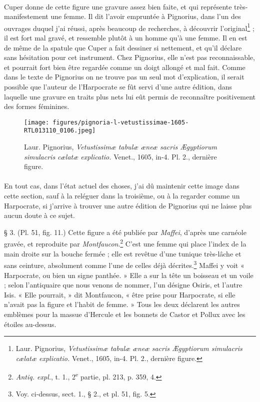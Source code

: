 \documentclass[a4paper, 11pt, oneside, polutonikogreek, french]{article}
\begin{document}
\paragraph{}
Cuper donne de cette figure une gravure assez bien faite, et qui représente très-manifestement une femme. Il dit l'avoir empruntée à Pignorius, dans l'un des ouvrages duquel j'ai réussi, après beaucoup de recherches, à découvrir l'original\footnote{Laur. Pignorius, \emph{Vetustissimæ tabulæ æneæ sacris Ægyptiorum simulacris cælatæ explicatio.} Venet., 1605, in-4. Pl. 2., dernière figure.} ; il est fort mal gravé, et ressemble plutôt à un homme qu'à une femme. Il en est de même de la spatule que Cuper a fait dessiner si nettement, et qu'il déclare sans hésitation pour cet instrument. Chez Pignorius, elle n'est pas reconnaissable, et pourrait fort bien être regardée comme un doigt allongé et mal fait. Comme dans le texte de Pignorius on ne trouve pas un seul mot d'explication, il serait possible que l'auteur de l'Harpocrate se fût servi d'une autre édition, dans laquelle une gravure en traits plus nets lui eût permis de reconnaître positivement des formes féminines.

\begin{figure}[H]
\centering
\texttt{[image: figures/pignoria-l-vetustissimae-1605-RTL013110\_0106.jpeg]}
\caption{Laur. Pignorius, \emph{Vetustissimæ tabulæ æneæ sacris Ægyptiorum simulacris cælatæ explicatio.} Venet., 1605, in-4. Pl. 2., dernière figure.}
\end{figure}
\paragraph{}
En tout cas, dans l'état actuel des choses, j'ai dû maintenir cette image dans cette section, sauf à la reléguer dans la troisième, ou à la regarder comme un Harpocrate, si j'arrive à trouver une autre édition de Pignorius qui ne laisse plus aucun doute à ce sujet.

§ 3. (Pl. 51, fig. 11.) Cette figure a été publiée par \emph{Maffei}, d'après une carnéole gravée, et reproduite par \emph{Montfaucon}.\footnote{\emph{Antiq. expl.}, t. 1., 2\textsuperscript{e} partie, pl. 213, p. 359, 4.} C'est une femme qui place l'index de la main droite sur la bouche fermée ; elle est revêtue d'une tunique très-lâche et sans ceinture, absolument comme l'une de celles déjà décrites.\footnote{Voy. ci-dessus, sect. 1., § 2., et pl. 51, fig. 5.} Maffei y voit « Harpocrate, ou bien un signe panthée. » Elle a sur la tête un boisseau et un voile ; selon l'antiquaire que nous venons de nommer, l'un désigne Osiris, et l'autre Isis. « Elle pourrait, » dit Montfaucon, « être prise pour Harpocrate, si elle n'avait pas la figure et l'habit de femme. » Tous les deux déclarent les autres emblèmes pour la massue d'Hercule et les bonnets de Castor et Pollux avec les étoiles au-dessus.
\end{document}
